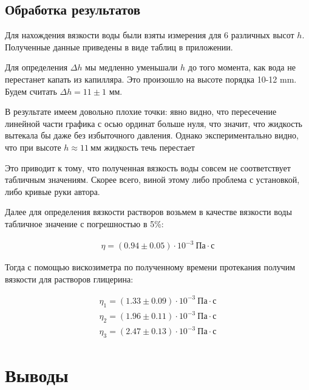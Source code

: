 \documentclass[a4paper,12pt]{report}
\begin{document}
    \begin{multicols}{2}
        \section{Обработка результатов}
        Для нахождения вязкости воды были взяты измерения для 6 различных высот $h$. Полученные данные приведены в виде таблиц в приложении.

        Для определения $\Delta h$ мы медленно уменьшали $h$ до того момента, как вода не перестанет капать из капилляра. Это произошло на высоте порядка 10-12 mm. Будем считать $\Delta h = 11\pm 1$ мм.

        В результате имеем довольно плохие точки: явно видно, что пересечение линейной части графика с осью ординат больше нуля, что значит, что жидкость вытекала бы даже без избыточного давления. Однако экспериментально видно, что при высоте $h\approx 11 \ \text{мм}$ жидкость течь перестает

        Это приводит к тому, что полученная вязкость воды совсем не соответствует табличным значениям. Скорее всего, виной этому либо проблема с установкой, либо кривые руки автора.

        Далее для определения вязкости растворов возьмем в качестве вязкости воды табличное значение с погрешностью в 5\%:

        \begin{gather*}
            \eta = (0.94 \pm 0.05) \cdot 10^{-3} \ \text{Па}\cdot \text{с}
        \end{gather*}

        Тогда с помощью вискозиметра по полученному времени протекания получим вязкости для растворов глицерина:

        \begin{gather*}
            \eta_1 = (1.33 \pm 0.09) \cdot 10^{-3} \ \text{Па}\cdot \text{с} \\
            \eta_2 = (1.96 \pm 0.11) \cdot 10^{-3} \ \text{Па}\cdot \text{с} \\ 
            \eta_3 = (2.47 \pm 0.13) \cdot 10^{-3} \ \text{Па}\cdot \text{с}
        \end{gather*}

    \end{multicols}

    \newpage

    \section{Выводы}
\end{document}

